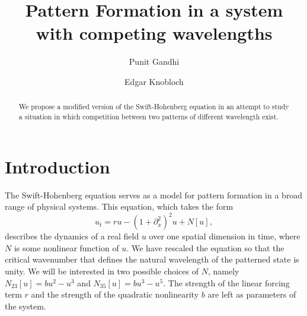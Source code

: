 \documentclass[api,pof,pre,12pt,a4paper]{revtex4-1}
\begin{document}

\title{Pattern Formation in a system with competing wavelengths}

\author{Punit Gandhi}
\author{Edgar Knobloch}

\begin{abstract}
We propose a modified version of the Swift-Hohenberg equation in an attempt to study a situation in which competition between two patterns of different wavelength exist.
\end{abstract}

\maketitle

\section{Introduction}
The Swift-Hohenberg equation serves as a model for pattern formation in a broad range of physical systems.   This equation, which takes the form  
\begin{equation}
u_t= r u-\left(1+\partial_{x}^2\right)^2u+N[u]\label{eq:SH},
\end{equation}
describes the dynamics of a real field $u$ over one spatial dimension in time, where $N$ is some nonlinear function of $u$.  We have rescaled the equation so that the critical wavenumber that defines the natural wavelength of the patterned state is unity.  We will be interested in two possible choices of $N$, namely $N_{23}[u]=bu^2-u^3$ and $N_{35}[u]=b u^3-u^5$.  The strength of the linear forcing term $r$ and the strength of the quadratic nonlinearity $b$ are left as parameters of the system.  
\end{document}
